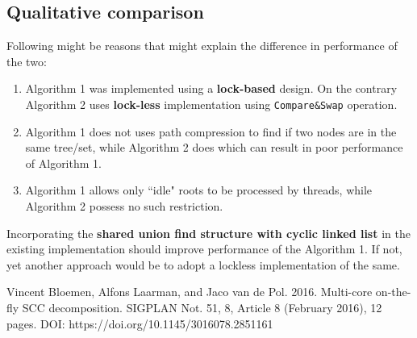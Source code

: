 \documentclass[a4paper]{article}
\begin{document}
\subsection{Qualitative comparison}

Following might be reasons that might explain the difference in performance of the two:
\begin{enumerate}
    \item Algorithm 1 was implemented using a \textbf{lock-based} design. On the contrary Algorithm 2 uses \textbf{lock-less} implementation using \texttt{Compare\&Swap} operation.
    \item Algorithm 1 does not uses path compression to find if two nodes are in the same tree/set, while Algorithm 2 does which can result in poor performance of Algorithm 1.
    \item Algorithm 1 allows only ``idle" roots to be processed by threads, while Algorithm 2 possess no such restriction.
\end{enumerate}

Incorporating the \textbf{shared union find structure with cyclic linked list} in the existing implementation should improve performance of the Algorithm 1. If not, yet another approach would be to adopt a lockless implementation of the same.

\begin{thebibliography}{9}
  Vincent Bloemen, Alfons Laarman, and Jaco van de Pol. 2016. Multi-core on-the-fly SCC decomposition. SIGPLAN Not. 51, 8, Article 8 (February 2016), 12 pages. DOI: https://doi.org/10.1145/3016078.2851161

\end{thebibliography}
\end{document}
